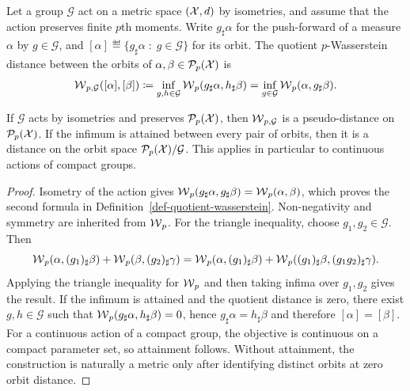 \begin{defn}\label{def-quotient-wasserstein}
	Let a group $\mathcal G$ act on a metric space $(\mathcal{X},d)$ by isometries, and assume that the action preserves finite $p$th moments. Write $g_\sharp\alpha$ for the push-forward of a measure $\alpha$ by $g\in\mathcal G$, and $[\alpha]\eqdef\{g_\sharp\alpha\;:\;g\in\mathcal G\}$ for its orbit. The quotient $p$-Wasserstein distance between the orbits of $\alpha,\beta\in\mathcal{P}_p(\mathcal{X})$ is
	\[
		\operatorname{\mathcal{W}}_{p,\mathcal G}([\alpha],[\beta])
		\coloneqq
		\inf_{g,h\in\mathcal G}\operatorname{\mathcal{W}}_p(g_\sharp\alpha,h_\sharp\beta)
		=
		\inf_{g\in\mathcal G}\operatorname{\mathcal{W}}_p(\alpha,g_\sharp\beta).
	\]
\end{defn}

\begin{prop}\label{prop-quotient-wasserstein-metric}
	If $\mathcal G$ acts by isometries and preserves $\mathcal{P}_p(\mathcal{X})$, then $\operatorname{\mathcal{W}}_{p,\mathcal G}$ is a pseudo-distance on $\mathcal{P}_p(\mathcal{X})$. If the infimum is attained between every pair of orbits, then it is a distance on the orbit space $\mathcal{P}_p(\mathcal{X})/\mathcal G$. This applies in particular to continuous actions of compact groups.
\end{prop}

\begin{proof}
	Isometry of the action gives $\operatorname{\mathcal{W}}_p(g_\sharp\alpha,g_\sharp\beta)=\operatorname{\mathcal{W}}_p(\alpha,\beta)$, which proves the second formula in Definition~\ref{def-quotient-wasserstein}. Non-negativity and symmetry are inherited from $\operatorname{\mathcal{W}}_p$. For the triangle inequality, choose $g_1,g_2\in\mathcal G$. Then
	\[
		\operatorname{\mathcal{W}}_p(\alpha,(g_1)_\sharp\beta)
		+
		\operatorname{\mathcal{W}}_p(\beta,(g_2)_\sharp\gamma)
		=
		\operatorname{\mathcal{W}}_p(\alpha,(g_1)_\sharp\beta)
		+
		\operatorname{\mathcal{W}}_p((g_1)_\sharp\beta,(g_1g_2)_\sharp\gamma).
	\]
	Applying the triangle inequality for $\operatorname{\mathcal{W}}_p$ and then taking infima over $g_1,g_2$ gives the result. If the infimum is attained and the quotient distance is zero, there exist $g,h\in\mathcal G$ such that $\operatorname{\mathcal{W}}_p(g_\sharp\alpha,h_\sharp\beta)=0$, hence $g_\sharp\alpha=h_\sharp\beta$ and therefore $[\alpha]=[\beta]$. For a continuous action of a compact group, the objective is continuous on a compact parameter set, so attainment follows. Without attainment, the construction is naturally a metric only after identifying distinct orbits at zero orbit distance.
\end{proof}

